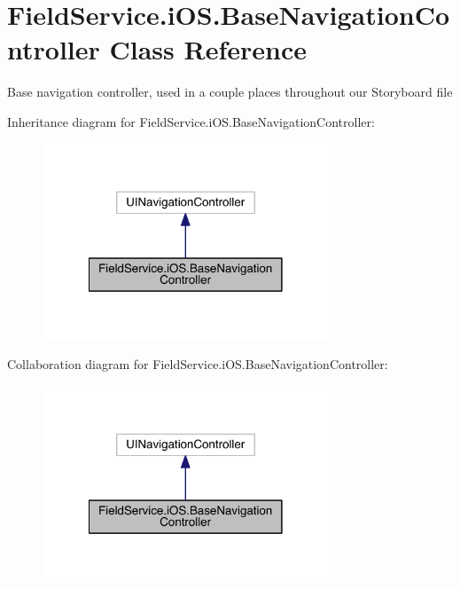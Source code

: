 \hypertarget{class_field_service_1_1i_o_s_1_1_base_navigation_controller}{\section{Field\+Service.\+i\+O\+S.\+Base\+Navigation\+Controller Class Reference}
\label{class_field_service_1_1i_o_s_1_1_base_navigation_controller}
}


Base navigation controller, used in a couple places throughout our Storyboard file  




Inheritance diagram for Field\+Service.\+i\+O\+S.\+Base\+Navigation\+Controller\+:
\nopagebreak
\begin{figure}[H]
\begin{center}
\leavevmode
\includegraphics[width=242pt]{class_field_service_1_1i_o_s_1_1_base_navigation_controller__inherit__graph}
\end{center}
\end{figure}


Collaboration diagram for Field\+Service.\+i\+O\+S.\+Base\+Navigation\+Controller\+:
\nopagebreak
\begin{figure}[H]
\begin{center}
\leavevmode
\includegraphics[width=242pt]{class_field_service_1_1i_o_s_1_1_base_navigation_controller__coll__graph}
\end{center}
\end{figure}
